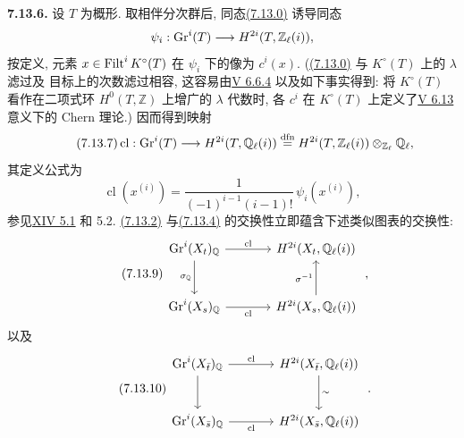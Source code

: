 \textbf{7.13.6.} 设 $T$ 为概形. 取相伴分次群后, 同态\hyperlink{sga6.e10.eq.7-13-0}{(7.13.0)} 诱导同态
%
%
\[
\psi_i:\operatorname{Gr}^i(T)\longrightarrow H^{2i}(T,\mathbb Z_\ell(i)),
\]
按定义, 元素 $x\in\operatorname{Filt}^iK^\circ(T)$ 在 $\psi_i$ 下的像为 $c^i(x)$. (\hyperlink{sga6.e10.eq.7-13-0}{(7.13.0)} 与 $K^\circ(T)$ 上的 $\lambda$ 滤过及
%
%
目标上的次数滤过相容, 这容易由\hyperlink{sga6.e05.cor.6-6-4}{V 6.6.4} 以及如下事实得到: 将 $K^\circ(T)$ 看作在二项式环 $H^0(T,\mathbb Z)$ 上增广的 $\lambda$ 代数时, 各 $c^i$ 在 $K^\circ(T)$ 上定义了\hyperlink{sga6.e05.def.6-13}{V 6.13} 意义下的 Chern 理论.) 因而得到映射
%
%
%
%
\begin{equation}\tag{7.13.7}
\operatorname{cl}:\operatorname{Gr}^i(T)\longrightarrow H^{2i}(T,\mathbb Q_\ell(i))
\stackrel{\mathrm{dfn}}{=}
H^{2i}(T,\mathbb Z_\ell(i))\otimes_{\mathbb Z_\ell}\mathbb Q_\ell,
\end{equation}
其定义公式为
\begin{equation}\tag{7.13.8}
\operatorname{cl}(x^{(i)})=
\frac{1}{(-1)^{i-1}(i-1)!}\,\psi_i(x^{(i)}),
\end{equation}
参见\hyperlink{sga6.e14.para.5-1}{XIV 5.1} 和 5.2. \hyperlink{sga6.e10.eq.7-13-2}{(7.13.2)} 与\hyperlink{sga6.e10.eq.7-13-4}{(7.13.4)} 的交换性立即蕴含下述类似图表的交换性:
%
\begin{equation}\tag{7.13.9}
\begin{tikzcd}[column sep=large,row sep=large]
\Gr^i(X_t)_{\mathbb Q} \arrow[r,"\operatorname{cl}"]
  \arrow[d,"\sigma_{\mathbb Q}"'] &
H^{2i}(X_t,\mathbb Q_\ell(i))\\
\Gr^i(X_s)_{\mathbb Q} \arrow[r,"\operatorname{cl}"'] &
H^{2i}(X_s,\mathbb Q_\ell(i)) \arrow[u,"\sigma^{-1}"]
\end{tikzcd}
\;,
\end{equation}
以及
\begin{equation}\tag{7.13.10}
\begin{tikzcd}[column sep=large,row sep=large]
\Gr^i(X_{\bar t})_{\mathbb Q} \arrow[r,"\operatorname{cl}"] \arrow[d] &
H^{2i}(X_{\bar t},\mathbb Q_\ell(i)) \arrow[d,"\sim"]\\
\Gr^i(X_{\bar s})_{\mathbb Q} \arrow[r,"\operatorname{cl}"'] &
H^{2i}(X_{\bar s},\mathbb Q_\ell(i))
\end{tikzcd}
\;.
\end{equation}

